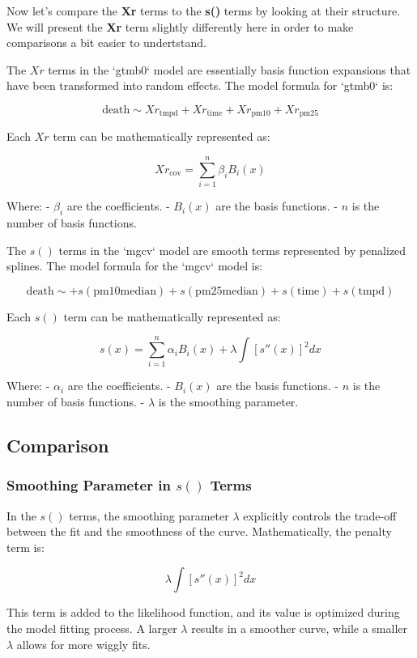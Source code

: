 \documentclass[12pt, twoside,hidelinks]{article}
\theoremstyle{definition}
\numberwithin{equation}{section}
\begin{document}
Now let's compare the \textbf{Xr} terms to the \textbf{s()} terms by looking at their structure. We will present the \textbf{Xr} term slightly differently here in order to make comparisons a bit easier to undertstand. 
\newline

The \(Xr\) terms in the `gtmb0` model are essentially basis function expansions that have been transformed into random effects. The model formula for `gtmb0` is:

\[
\text{death} \sim Xr_{\text{tmpd}} + Xr_{\text{time}} + Xr_{\text{pm10}} + Xr_{\text{pm25}}
\]

Each \(Xr\) term can be mathematically represented as:

\[
Xr_{\text{cov}} = \sum_{i=1}^{n} \beta_i B_i(x)
\]

Where:
- \( \beta_i \) are the coefficients.
- \( B_i(x) \) are the basis functions.
- \( n \) is the number of basis functions.
\newline

The \(s()\) terms in the `mgcv` model are smooth terms represented by penalized splines. The model formula for the `mgcv` model is:

\[
\text{death} \sim + s(\text{pm10median}) + s(\text{pm25median}) + s(\text{time}) + s(\text{tmpd})
\]

Each \(s()\) term can be mathematically represented as:

\[
s(x) = \sum_{i=1}^{n} \alpha_i B_i(x) + \lambda \int [s''(x)]^2 dx
\]

Where:
- \( \alpha_i \) are the coefficients.
- \( B_i(x) \) are the basis functions.
- \( n \) is the number of basis functions.
- \( \lambda \) is the smoothing parameter.

\subsection{Comparison}

\subsubsection{Smoothing Parameter in $s()$ Terms}

In the \(s()\) terms, the smoothing parameter \(\lambda\) explicitly controls the trade-off between the fit and the smoothness of the curve. Mathematically, the penalty term is:

\[
\lambda \int [s''(x)]^2 dx
\]

This term is added to the likelihood function, and its value is optimized during the model fitting process. A larger \(\lambda\) results in a smoother curve, while a smaller \(\lambda\) allows for more wiggly fits.
\end{document}
